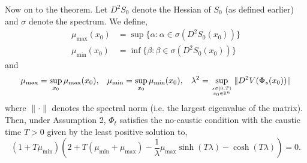 \documentclass[a4paper,12pt,draft]{report}
\theoremstyle{remark}
\theoremstyle{definition}
\begin{document}
Now on to the theorem.
\theorem
{
Let $D^2S_0$ denote the Hessian of $S_0$ (as defined earlier) and $\sigma$ denote the spectrum.  We define,
\begin{align}
\mu_{\mathrm{max}}(x_0) & = \sup\{\alpha : \alpha \in \sigma (D^2S_0(x_0)) \}\nonumber\\
\mu_{\mathrm{min}}(x_0) & = \inf\{\beta : \beta \in \sigma (D^2S_0(x_0)) \}\nonumber
\end{align}
and
$$
\mu_{\mathrm{max}} = \sup_{x_0}\mu_{\mathrm{max}}(x_0),
\hspace{3mm}
\mu_{\mathrm{min}} = \sup_{x_0}\mu_{\mathrm{min}}(x_0),
\hspace{3mm}
\lambda^2 = \sup_{s \in [0, \tilde{T}) \atop x_0 \in \mathbb{R}^n}\|D^2V(\Phi_s(x_0))\|
$$
where $\|\cdot\|$ denotes the spectral norm (i.e. the largest eigenvalue of the matrix).  Then, under Assumption 2, $\Phi_t$ satisfies the no-caustic condition with the caustic time $T > 0$ given by the least positive solution to,
$$
(1 + T\mu_{\mathrm{min}})\left(2 + T(\mu_{\mathrm{min}} + \mu_{\mathrm{max}}) - \frac{1}{\lambda}\mu_{\mathrm{max}}\sinh(T\lambda) - \cosh(T\lambda)\right) = 0.
$$
}
\proof
\end{document}
